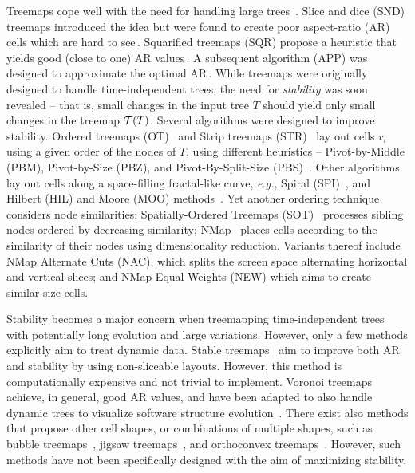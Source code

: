 Treemaps cope well with the need for handling large trees~\citep{schulz11_treesurvey,hci_treemaps,treevis,landesberger11}.  Slice and dice (SND) treemaps introduced the idea but were found to create poor aspect-ratio (AR) cells which are hard to see\,\citep{shneiderman92}. Squarified treemaps (SQR) propose a heuristic that yields good (close to one) AR values\,\citep{sqr}. A subsequent algorithm (APP) was designed to approximate the optimal AR\,\citep{nagamochi07}. While treemaps were originally designed to handle time-independent trees, the need for \emph{stability} was soon revealed -- that is, small changes in the input tree $T$ should yield only small changes in the treemap ${\cal T}(T)$.
Several algorithms were designed to improve stability. Ordered treemaps (OT)~\citep{ordered} and Strip treemaps (STR)~\citep{bederson02} lay out cells $r_i$ using a given order of the nodes of $T$, using different heuristics -- Pivot-by-Middle (PBM), Pivot-by-Size (PBZ), and Pivot-By-Split-Size (PBS)~\citep{ordered}. Other algorithms lay out cells along a space-filling fractal-like curve, \emph{e.g.}, Spiral (SPI)~\citep{spiral}, and Hilbert (HIL) and Moore (MOO) methods~\citep{hilbert_moore}. Yet another ordering technique considers node similarities: Spatially-Ordered Treemaps (SOT)~\citep{sot} processes sibling nodes ordered by decreasing similarity; NMap~\citep{nmap} places cells according to the similarity of their nodes using dimensionality reduction. Variants thereof include NMap Alternate Cuts (NAC), which splits the screen space alternating horizontal and vertical slices; and NMap Equal Weights (NEW) which aims to create similar-size cells.

Stability becomes a major concern when treemapping time-independent trees with potentially long evolution and large variations. However, only a few methods explicitly aim to treat dynamic data. Stable treemaps~\citep{sondag17} aim to improve both AR and stability by using non-sliceable layouts. However, this method is computationally expensive and not trivial to implement. Voronoi treemaps~\citep{balzer05,balzer05b}
achieve, in general, good AR values, and have been adapted to also handle dynamic trees to visualize software structure evolution~\citep{hees17,gotz11}. There exist also methods that propose other cell shapes, or combinations of multiple shapes, such as bubble treemaps~\citep{bubble}, jigsaw treemaps~\citep{jigsaw}, and orthoconvex treemaps~\citep{deberg14}. However, such methods have not been specifically designed with the aim of maximizing stability.


